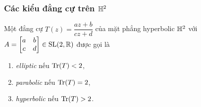 
\subsubsection{Các kiểu đẳng cự trên $\mathbb{H}^2$}
\begin{defn}
    Một đẳng cự $T(z) = \dfrac{az+b}{cz+d}$ của mặt phẳng hyperbolic $\mathbb{H}^2$ với $A = \begin{bmatrix} a & b \\ c & d \\ \end{bmatrix} \in \operatorname{SL}(2,\mathbb{R})$ được gọi là 
    \begin{enumerate}
        \item \textit{elliptic} nếu $\operatorname{Tr}(T) < 2$,
        \item \textit{parabolic} nếu $\operatorname{Tr}(T) = 2$,
        \item \textit{hyperbolic} nếu $\operatorname{Tr}(T) > 2$.
    \end{enumerate}
\end{defn}

